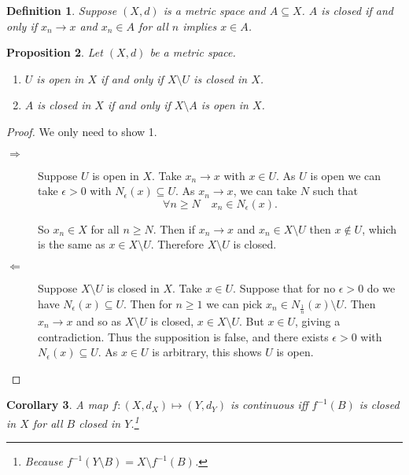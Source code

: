 \documentclass{notes}
\theoremstyle{plain}
\newtheorem{proposition}{Proposition}[chapter]
\newtheorem{corollary}[proposition]{Corollary}
\newtheorem{definition}[proposition]{Definition}
\newcommand{\Forall}[1]{\forall #1 \quad}
\begin{document}
\begin{definition}
Suppose $ (X,d) $ is a metric space and $ A \subseteq X $.  $A$ is closed 
if and only if $ x_{n} \to x $ and $ x_{n} \in A $ for 
all $ n $ implies $ x \in A $.
\end{definition}

\begin{proposition}
Let $ (X,d) $ be a metric space.
\begin{enumerate}
\item $ U $ is open in $ X $ if and only if $ X\setminus U $ is closed
  in $ X $.
\item $ A $ is closed in $ X $ if and only if $ X\setminus A $ is open
  in $ X $.
\end{enumerate}
\end{proposition}
\begin{proof} We only need to show 1.

\begin{description}
\item[$\Rightarrow$] Suppose $ U $ is open in $ X $.
Take $ x_{n}\to x $ with $ x \in U $.
As $ U $ is open we can take $ \epsilon>0 $ with
$N_{\epsilon}(x) \subseteq U$.
As $ x_{n} \to x $, we can take $ N $ such that
\[ \Forall{n \geq N} x_{n} \in N_{\epsilon}(x). \]

So $ x_{n} \in X$ for all $ n \geq N $.
Then if $ x_{n}\to x $ and $ x_{n}\in X\setminus U $ then $ x 
\not\in U $, which is the same as $ x \in X\setminus U $.
Therefore $ X\setminus U $ is closed.

\item[$ \Leftarrow $] Suppose $ X \setminus U $ is closed in $ X $.
Take $ x \in U $. Suppose that for no $ \epsilon>0 $ do we have
$N_{\epsilon}(x) \subseteq U$.
Then for $ n\geq 1 $ we can pick $x_{n} \in
N_{\frac{1}{n}}(x)\setminus U$.
 Then $ x_{n}\to x $ and so as $ X\setminus U $ is closed, $ x \in
 X\setminus U $. But $ x \in U $, giving a contradiction.
Thus the supposition is false, and there exists $ \epsilon>0 $ with
$N_{\epsilon}(x) \subseteq U$.
As $ x \in U $ is arbitrary, this shows $ U $ is open.
\end{description}
\end{proof}

\begin{corollary}
A map $ f\colon (X,d_{X}) \mapsto (Y,d_{Y}) $ is continuous iff $ 
f^{-1}(B) $ is closed in $ X $ for all $ B $ closed in $ Y 
$.\footnote{Because $f^{-1}(Y\setminus B) = X\setminus f^{-1}(B)$.}
\end{corollary}
\end{document}
